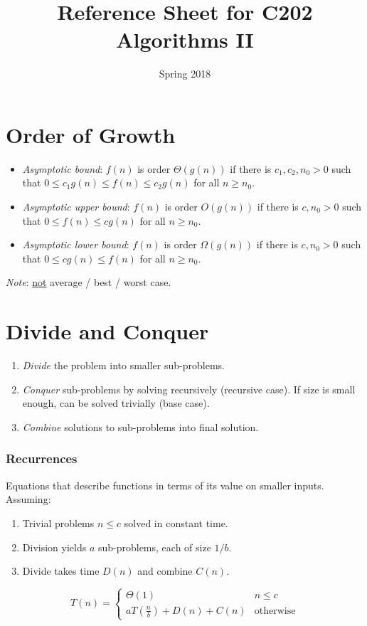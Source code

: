 \documentclass[twocolumn,english]{article}
\numberwithin{equation}{section}
\numberwithin{figure}{section}
\numberwithin{table}{section}
\begin{document}
\title{Reference Sheet for C202 Algorithms II}

\date{Spring 2018}
\maketitle

\section{Order of Growth}
\begin{itemize}
\item \emph{Asymptotic bound}: $f\left(n\right)$ is order $\Theta\left(g\left(n\right)\right)$
if there is $c_{1},c_{2},n_{0}>0$ such that $0\leq c_{1}g\left(n\right)\leq f\left(n\right)\leq c_{2}g\left(n\right)$
for all $n\geq n_{0}$.
\item \emph{Asymptotic upper bound}: $f\left(n\right)$ is order $O\left(g\left(n\right)\right)$
if there is $c,n_{0}>0$ such that $0\leq f\left(n\right)\leq cg\left(n\right)$
for all $n\geq n_{0}$.
\item \emph{Asymptotic lower bound}: $f\left(n\right)$ is order $\Omega\left(g\left(n\right)\right)$
if there is $c,n_{0}>0$ such that $0\leq cg\left(n\right)\leq f\left(n\right)$
for all $n\geq n_{0}$.
\end{itemize}
\emph{Note}: \uline{not} average / best / worst case.

\section{Divide and Conquer}
\begin{enumerate}
\item \emph{Divide} the problem into smaller sub-problems.
\item \emph{Conquer} sub-problems by solving recursively (recursive case).
If size is small enough, can be solved trivially (base case).
\item \emph{Combine} solutions to sub-problems into final solution.
\end{enumerate}

\subsubsection*{Recurrences}

Equations that describe functions in terms of its value on smaller
inputs. Assuming:
\begin{enumerate}
\item Trivial problems $n\leq c$ solved in constant time.
\item Division yields $a$ sub-problems, each of size $1/b$.
\item Divide takes time $D\left(n\right)$ and combine $C\left(n\right)$.
\end{enumerate}
\[
T\left(n\right)=\begin{cases}
\Theta\left(1\right) & n\leq c\\
aT\left(\frac{n}{b}\right)+D\left(n\right)+C\left(n\right) & \text{otherwise}
\end{cases}
\]
\end{document}
